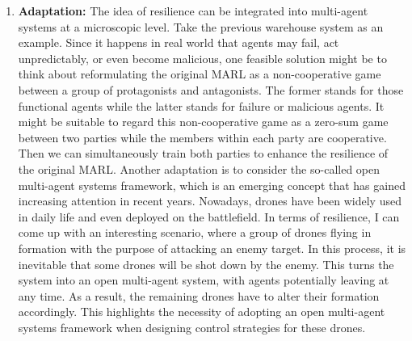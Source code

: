 \documentclass[11pt]{article}
\begin{document}
\begin{enumerate}
    \item \textbf{Adaptation:} The idea of resilience can be integrated into multi-agent systems at a microscopic level. Take the previous warehouse system as an example. Since it happens in real world that agents may fail, act unpredictably, or even become malicious, one feasible solution might be to think about reformulating the original MARL as a non-cooperative game between a group of protagonists and antagonists. The former stands for those functional agents while the latter stands for failure or malicious agents. It might be suitable to regard this non-cooperative game as a zero-sum game between two parties while the members within each party are cooperative. Then we can simultaneously train both parties to enhance the resilience of the original MARL. Another adaptation is to consider the so-called open multi-agent systems framework, which is an emerging concept that has gained increasing attention in recent years. Nowadays, drones have been widely used in daily life and even deployed on the battlefield. In terms of resilience, I can come up with an interesting scenario, where a group of drones flying in formation with the purpose of attacking an enemy target. In this process, it is inevitable that some drones will be shot down by the enemy. This turns the system into an open multi-agent system, with agents potentially leaving at any time. As a result, the remaining drones have to alter their formation accordingly. This highlights the necessity of adopting an open multi-agent systems framework when designing control strategies for these drones. 
\end{enumerate}
\end{document}
